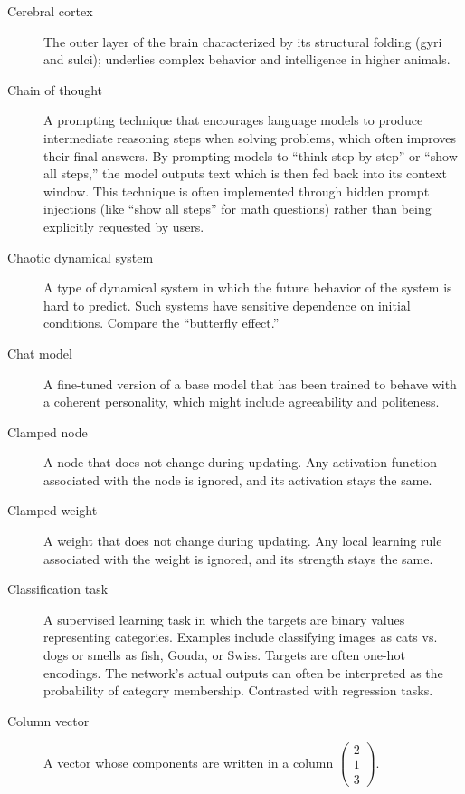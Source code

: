 \begin{description}
\item[Cerebral cortex] The outer layer of the brain characterized by its structural folding (gyri and sulci); underlies complex behavior and intelligence in higher animals.

\item[Chain of thought] A prompting technique that encourages language models to produce intermediate reasoning steps when solving problems, which often improves their final answers. By prompting models to ``think step by step'' or ``show all steps,'' the model outputs text which is then fed back into its context window. This technique is often implemented through hidden prompt injections (like ``show all steps'' for math questions) rather than being explicitly requested by users.

\item[Chaotic dynamical system] A type of dynamical system in which the future behavior of the system is hard to predict. Such systems have sensitive dependence on initial conditions. Compare the ``butterfly effect.''

\item[Chat model] A fine-tuned version of a base model that has been trained to behave with a coherent personality, which might include agreeability and politeness.

\item[Clamped node] A node that does not change during updating. Any activation function associated with the node is ignored, and its activation stays the same.

\item[Clamped weight] A weight that does not change during updating. Any local learning rule associated with the weight is ignored, and its strength stays the same.

\item[Classification task] A supervised learning task in which the targets are binary values representing categories. Examples include classifying images as cats vs. dogs or smells as fish, Gouda, or Swiss. Targets are often one-hot encodings. The network's actual outputs can often be interpreted as the probability of category membership. Contrasted with regression tasks.

\item[Column vector] A vector whose components are written in a column \eg $\displaystyle \begin{pmatrix} 2 \\ 1 \\ 3 \end{pmatrix}$.


\end{description}

